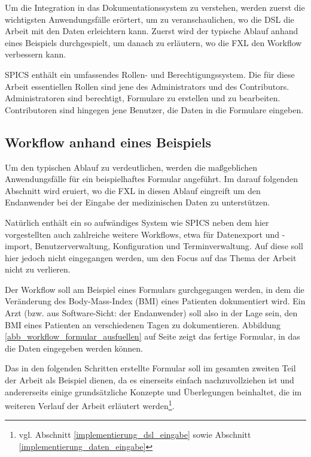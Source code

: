 Um die Integration in das Dokumentationssystem zu verstehen, werden zuerst die wichtigsten Anwendungsfälle erörtert, um zu veranschaulichen, wo die DSL die Arbeit mit den Daten erleichtern kann. Zuerst wird der typische Ablauf anhand eines Beispiels durchgespielt, um danach zu erläutern, wo die FXL den Workflow verbessern kann.

SPICS enthält ein umfassendes Rollen- und Berechtigungssystem. Die für diese Arbeit essentiellen Rollen sind jene des Administrators und des Contributors. Administratoren sind berechtigt, Formulare zu erstellen und zu bearbeiten. Contributoren sind hingegen jene Benutzer, die Daten in die Formulare eingeben.

\subsection{Workflow anhand eines Beispiels}
\label{subsection_workflow_beispiel}


Um den typischen Ablauf zu verdeutlichen, werden die maßgeblichen Anwendungsfälle für ein beispielhaftes Formular angeführt. Im darauf folgenden Abschnitt wird eruiert, wo die FXL in diesen Ablauf eingreift um den Endanwender bei der Eingabe der medizinischen Daten zu unterstützen.

Natürlich enthält ein so aufwändiges System wie SPICS neben dem hier vorgestellten auch zahlreiche weitere Workflows, etwa für Datenexport und -import, Benutzerverwaltung, Konfiguration und Terminverwaltung. Auf diese soll hier jedoch nicht eingegangen werden, um den Focus auf das Thema der Arbeit nicht zu verlieren.

Der Workflow soll am Beispiel eines Formulars gurchgegangen werden, in dem die Veränderung des Body-Mass-Index (BMI) eines Patienten dokumentiert wird. Ein Arzt (bzw. aus Software-Sicht: der Endanwender) soll also in der Lage sein, den BMI eines Patienten an verschiedenen Tagen zu dokumentieren. Abbildung \ref{abb_workflow_formular_ausfuellen} auf Seite \pageref{abb_workflow_formular_ausfuellen} zeigt das fertige Formular, in das die Daten eingegeben werden können.

Das in den folgenden Schritten erstellte Formular soll im gesamten zweiten Teil der Arbeit als Beispiel dienen, da es einerseits einfach nachzuvollziehen ist und andererseits einige grundsätzliche Konzepte und Überlegungen beinhaltet, die im weiteren Verlauf der Arbeit erläutert werden\footnote{vgl. Abschnitt \ref{implementierung_dsl_eingabe}   sowie Abschnitt \ref{implementierung_daten_eingabe} }.

